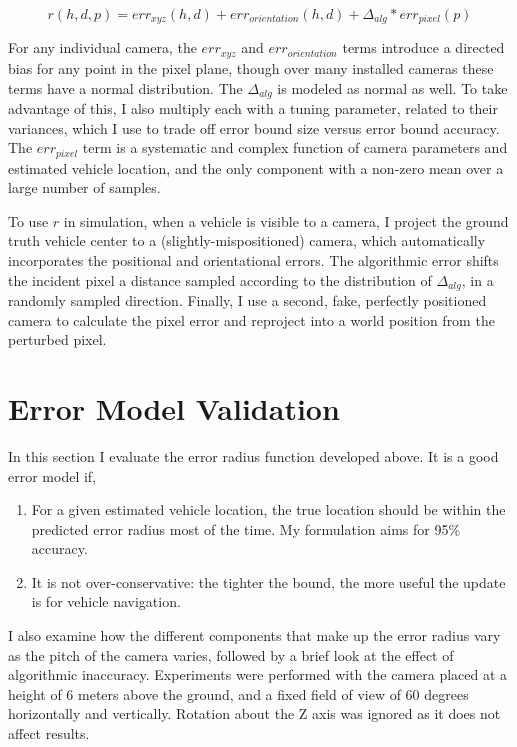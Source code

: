 \documentclass[a4paper,12pt,twoside,openright]{report}
\begin{document}
\[
    r(h,d,p) = err_{xyz}(h,d) + err_{orientation}(h,d) + \Delta_{alg}*err_{pixel}(p)
\]

For any individual camera, the $err_{xyz}$ and $err_{orientation}$ terms introduce
a directed bias for any point in the pixel plane, though over many installed cameras
these terms have a normal distribution. The $\Delta_{alg}$ is 
modeled as normal as well. To take advantage of this, I also multiply each with a tuning
parameter, related to their variances, which I use to trade off error bound size versus
error bound accuracy. The $err_{pixel}$ term is a systematic 
and complex function of camera parameters and estimated vehicle location, and
the only component with a non-zero mean over a large number of samples.

To use $r$ in simulation, when a vehicle is visible to a camera,
I project the ground truth vehicle center to a (slightly-mispositioned) camera, which
automatically incorporates the positional and orientational errors.
The algorithmic error shifts the incident pixel a distance sampled according to the distribution 
of $\Delta_{alg}$, in a randomly sampled direction. 
Finally, I use a second, fake, perfectly positioned camera 
to calculate the pixel error and reproject into a world position from the perturbed pixel.

\section{Error Model Validation}
\label{sec:camera:validation}

In this section I evaluate the error radius function developed above. It is a good error model if,

\begin{enumerate}
    \item For a given estimated vehicle location, the true location should be within the predicted
          error radius most of the time. My formulation aims for 95\% accuracy.
    \item It is not over-conservative: the tighter the bound, the more useful the update is
          for vehicle navigation.
\end{enumerate}

I also examine how the different components that make up the error radius vary
as the pitch of the camera varies, followed by a brief look at the
effect of algorithmic inaccuracy. Experiments were performed
with the camera placed at a height of 6 meters above the ground, and a fixed
field of view of 60 degrees horizontally and vertically. Rotation about the Z axis
was ignored as it does not affect results.
\end{document}
